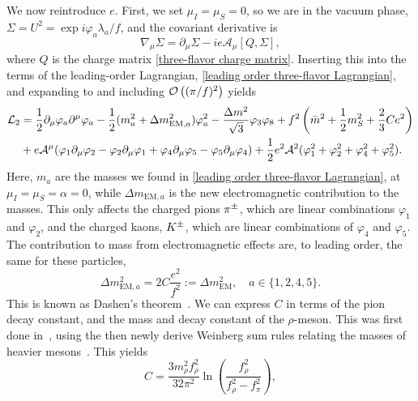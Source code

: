 We now reintroduce $e$.
First, we set $\mu_I = \mu_S = 0$, so we are in the vacuum phase, $\Sigma = U^2 = \exp{i \varphi_a \lambda_a/f}$, and the covariant derivative is
%
\begin{equation}
    \nabla_\mu \Sigma = \partial_\mu \Sigma - i e \mathcal A_\mu [Q, \Sigma],
\end{equation}
%
where $Q$ is the charge matrix \autoref{three-flavor charge matrix}.
Inserting this into the terms of the leading-order Lagrangian, \autoref{leading order three-flavor Lagrangian}, and expanding to and including $\mathcal O\left((\pi/f)^2\right)$ yields
%
\begin{align}
    \nonumber
    \mathcal{L}_2
    &= 
    \frac{1}{2} \partial_\mu \varphi_a \partial^\mu \varphi_a
    - \frac{1}{2}(m_{a}^2 + \Delta m_{\text{EM},a}^2)\varphi_a^2
    - \frac{\Delta m^2}{\sqrt 3} \varphi_3 \varphi_8
    + f^2 \left(\bar m^2 + \frac{1}{2} m_S^2 + \frac{2}{3}C e^2\right)\\
    &+ e \mathcal A^\mu 
    (
        \varphi_1 \partial_\mu \varphi_2
        - \varphi_2 \partial_\mu \varphi_1
        + \varphi_4 \partial_\mu \varphi_5
        - \varphi_5 \partial_\mu \varphi_4
    )
    + \frac{1}{2} e^2 \mathcal A^2 (\varphi_1^2 +\varphi_2^2 + \varphi_4^2 +\varphi_5^2).
\end{align}
%
Here, $m_{a}$ are the masses  we found in \autoref{leading order three-flavor Lagrangian}, at $\mu_I = \mu_S = \alpha = 0$, while $\Delta m_{\text{EM}, a}$ is the new electromagnetic contribution to the masses.
This only affects the charged pions ${\pi^\pm}$, which are linear combinations $\varphi_1$ and $\varphi_2$, and the charged kaons, ${K^\pm}$, which are linear combinations of $\varphi_4$ and $\varphi_5$.
The contribution to mass from electromagnetic effects are, to leading order, the same for these particles,
%
\begin{equation}
    \Delta m_{\text{EM}, a}^2 = 2C \frac{e^2}{f^2} := \Delta m^2_\text{EM}, \quad a \in \{1, 2, 4, 5\}.
\end{equation}
%
This is known as Dashen's theorem~\autocite{dashenChiralMathrmSUEnsuremath1969}.
We can express $C$ in terms of the pion decay constant, and the mass and decay constant of the $\rho$-meson.
This was first done in~\autocite{dasElectromagneticMassDifference1967}, using the then newly derive Weinberg sum rules relating the masses of heavier mesons~\autocite{weinbergPreciseRelationsSpectra1967}.
This yields
%
\begin{equation}
    \label{C from rho}
    C = \frac{3 m_\rho^2 f_\rho^2}{32 \pi^2} 
    \ln\left(  \frac{f_\rho^2}{f_\rho^2 - f_\pi^2}  \right),
\end{equation}
